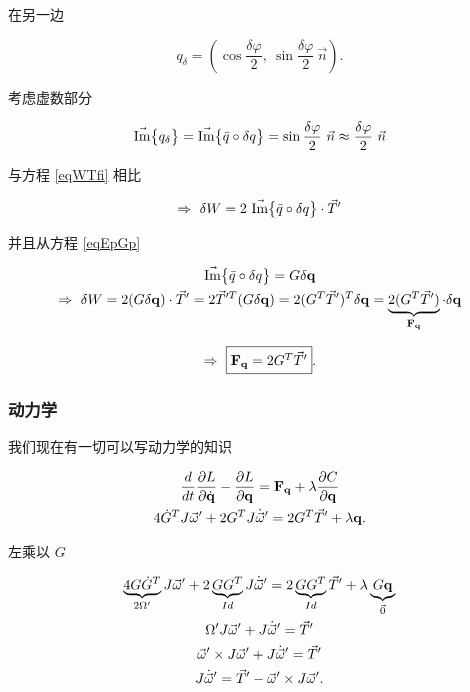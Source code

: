 在另一边

\begin{equation*}
q_\delta = (\cos{\frac{\delta \varphi}{2}},\  \sin{\frac{\delta \varphi}{2}}\ \vec{n}).
\end{equation*}

考虑虚数部分

\begin{gather*}
\vec{\textrm{Im}}\big\{ q_\delta \big\} = \vec{\textrm{Im}}\big\{ \bar{q} \circ \delta q \big\} = \sin{\frac{\delta \varphi}{2}}\ \vec{n} \approx  \frac{\delta \varphi}{2}\ \vec{n}
\end{gather*}

与方程 \eqref{eqWTfi} 相比

\begin{equation*}
\Rightarrow \ \delta W = 2 \  \vec{\textrm{Im}}\big\{ \bar{q} \circ \delta q \big\} \cdot \vec{T}'
\end{equation*}


并且从方程 \eqref{eqEpGp}

\begin{gather*}
\vec{\textrm{Im}}\big\{ \bar{q} \circ \delta q \big\} = G \mathbf{\delta q} \\
\Rightarrow \ \delta W = 2(G \mathbf{\delta q}) \cdot \vec{T}' = 2 \vec{T}'^T (G \mathbf{\delta q})  = 2(G^T \vec{T}')^T \mathbf{\delta q} = \underbrace{2(G^T \vec{T}')}_{\mathbf{F_q}} \cdot \mathbf{\delta q}
\end{gather*}

\begin{equation}
\Rightarrow \ \fbox{$ \mathbf{F_q} = 2G^T \vec{T}'$}.
\label{eqForce}
\end{equation}


\subsubsection{动力学}
\label{quat_rigid_dyn_IN_3}

我们现在有一切可以写动力学的知识

\begin{gather*}
\frac{d}{dt}\frac{\partial L}{\partial \dot{\mathbf{q}}} - \frac{\partial L}{\partial \mathbf{q}} = \mathbf{F_q} + \lambda \frac{\partial C}{\partial \mathbf{q}} \\
4 \dot{G}^T J \vec{\omega}' + 2 G^T J \dot{\vec{\omega}}' = 2G^T \vec{T}' + \lambda \mathbf{q}. \\
\end{gather*}

左乘以 $G$

\begin{gather*}
\underbrace{4 G \dot{G}^T}_{2\Omega'} J \vec{\omega}' + 2 \underbrace{GG^T}_{Id} J \dot{\vec{\omega}}' = 2 \underbrace{GG^T}_{Id} \vec{T}' + \lambda \underbrace{G \mathbf{q}}_{\vec{0}} \\
\Omega' J \vec{\omega}' +  J \dot{\vec{\omega}}' =  \vec{T}' \\
\vec{\omega}' \times J \vec{\omega}' +  J \dot{\vec{\omega}}' =  \vec{T}' \\
J \dot{\vec{\omega}}' =  \vec{T}' - \vec{\omega}' \times J \vec{\omega}'.  
\end{gather*}

